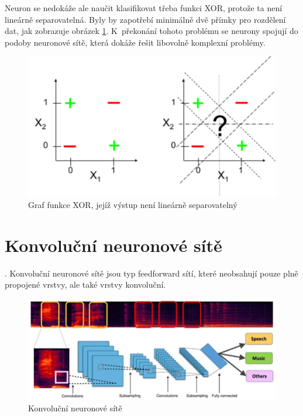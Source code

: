 Neuron se nedokáže ale naučit klasifikovat třeba funkci XOR, protože ta není lineárně separovatelná. Byly by zapotřebí minimálně dvě přímky pro rozdělení dat, jak zobrazuje obrázek \ref{fig:xor}. K~překonání tohoto problému se neurony spojují do podoby neuronové sítě, která dokáže řešit libovolně komplexní problémy.

\begin{figure}[H]
    \centering
    \includegraphics[scale=0.3]{obrazky-figures/xor.png}
    \caption{\label{fig:xor}Graf funkce XOR, jejíž výstup není lineárně separovatelný} 
\end{figure}





\section{Konvoluční neuronové sítě}
.
Konvoluční neuronové sítě jsou typ feedforward sítí, které neobsahují pouze plně propojené vrstvy, ale také vrstvy konvoluční.
\begin{figure}[H]
    \centering
    \includegraphics[scale=0.5]{obrazky-figures/conv_nn_audio.jpg}
    \caption{\label{fig:conv_nn}Konvoluční neuronové sítě}
\end{figure}

